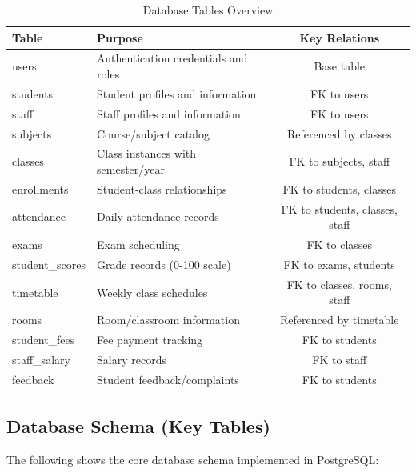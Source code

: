 \documentclass[12pt,a4paper]{article}
\begin{document}
\begin{table}[H]
\centering
\begin{tabularx}{\textwidth}{|l|X|c|}
\hline
\textbf{Table} & \textbf{Purpose} & \textbf{Key Relations} \\
\hline
users & Authentication credentials and roles & Base table \\
\hline
students & Student profiles and information & FK to users \\
\hline
staff & Staff profiles and information & FK to users \\
\hline
subjects & Course/subject catalog & Referenced by classes \\
\hline
classes & Class instances with semester/year & FK to subjects, staff \\
\hline
enrollments & Student-class relationships & FK to students, classes \\
\hline
attendance & Daily attendance records & FK to students, classes, staff \\
\hline
exams & Exam scheduling & FK to classes \\
\hline
student\_scores & Grade records (0-100 scale) & FK to exams, students \\
\hline
timetable & Weekly class schedules & FK to classes, rooms, staff \\
\hline
rooms & Room/classroom information & Referenced by timetable \\
\hline
student\_fees & Fee payment tracking & FK to students \\
\hline
staff\_salary & Salary records & FK to staff \\
\hline
feedback & Student feedback/complaints & FK to students \\
\hline
\end{tabularx}
\caption{Database Tables Overview}
\end{table}

\subsection{Database Schema (Key Tables)}

The following shows the core database schema implemented in PostgreSQL:
\end{document}
